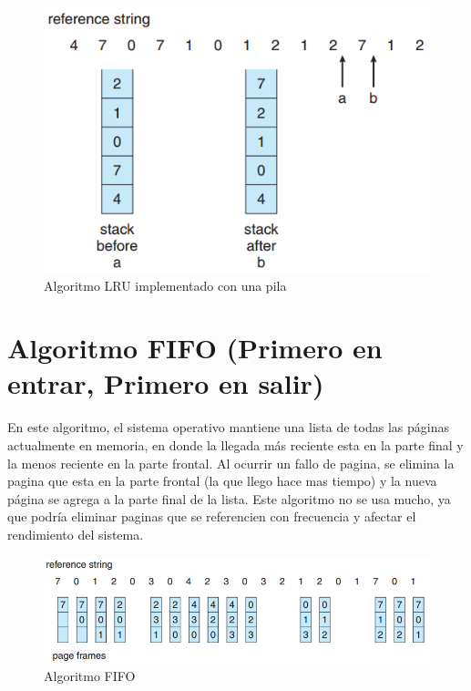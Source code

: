 \documentclass{article}
\begin{document}
\begin{figure}[H]
	\centering
	\includegraphics[scale=0.7]{img/lru2.png}
	\caption{Algoritmo LRU implementado con una pila}
\end{figure}


{\centering \section*{Algoritmo FIFO (Primero en entrar, Primero en salir)}}
En este algoritmo, el sistema operativo mantiene una lista de todas las páginas actualmente en memoria, en donde la llegada más reciente esta en la parte final y la menos reciente en la parte frontal. Al ocurrir un fallo de pagina, se elimina la pagina que esta en la parte frontal (la que llego hace mas tiempo) y la nueva página se agrega a la parte final de la lista. Este algoritmo no se usa mucho, ya que podría eliminar paginas que se referencien con frecuencia y afectar el rendimiento del sistema.

\begin{figure}[H]
	\centering
	\includegraphics[scale=0.7]{img/fifo.png}
	\caption{Algoritmo FIFO}
\end{figure}
\end{document}
